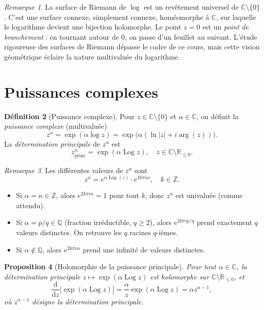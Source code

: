 \documentclass[12pt,a4paper,openany]{book}
\theoremstyle{definition}
\newtheorem{definition}{Définition}[chapter]
\theoremstyle{plain}
\newtheorem{proposition}[definition]{Proposition}
\theoremstyle{remark}
\newtheorem{remarque}[definition]{Remarque}
\newcommand{\C}{\mathbb{C}}
\newcommand{\R}{\mathbb{R}}
\newcommand{\Z}{\mathbb{Z}}
\newcommand{\Q}{\mathbb{Q}}
\DeclareMathOperator{\Log}{Log}
\newcommand{\dd}{\mathrm{d}}
\newcommand{\abs}[1]{\left|#1\right|}
\begin{document}
\begin{remarque}\label{rem:surface-riemann-intuition}
La surface de Riemann de $\log$ est un revêtement universel de $\C \setminus \{0\}$. C'est une surface connexe, simplement connexe, homéomorphe à $\C$, sur laquelle le logarithme devient une bijection holomorphe. Le point $z = 0$ est un \emph{point de branchement} : en tournant autour de $0$, on passe d'un feuillet au suivant. L'étude rigoureuse des surfaces de Riemann dépasse le cadre de ce cours, mais cette vision géométrique éclaire la nature multivaluée du logarithme.
\end{remarque}

\section{Puissances complexes}\label{sec:puissances}

\begin{definition}[Puissance complexe]\label{def:puissance-complexe}
Pour $z \in \C \setminus \{0\}$ et $\alpha \in \C$, on définit la \emph{puissance complexe} (multivaluée)
\[
  z^\alpha = \exp(\alpha \log z) = \exp\bigl(\alpha(\ln\abs{z} + i\arg(z))\bigr).
\]
La \emph{détermination principale} de $z^\alpha$ est
\[
  z^\alpha_{\mathrm{princ}} = \exp(\alpha \Log z), \quad z \in \C \setminus \R_{\leq 0}.
\]
\end{definition}

\begin{remarque}\label{rem:puissance-multivaluee}
Les différentes valeurs de $z^\alpha$ sont
\[
  z^\alpha = e^{\alpha \Log(z)} \cdot e^{2k\pi i \alpha}, \quad k \in \Z.
\]
\begin{itemize}
  \item Si $\alpha = n \in \Z$, alors $e^{2k\pi i n} = 1$ pour tout $k$, donc $z^n$ est univaluée (comme attendu).
  \item Si $\alpha = p/q \in \Q$ (fraction irréductible, $q \geq 2$), alors $e^{2k\pi i p/q}$ prend exactement $q$ valeurs distinctes. On retrouve les $q$ racines $q$-ièmes.
  \item Si $\alpha \notin \Q$, alors $e^{2k\pi i \alpha}$ prend une infinité de valeurs distinctes.
\end{itemize}
\end{remarque}

\begin{proposition}[Holomorphie de la puissance principale]\label{prop:puissance-holomorphe}
Pour tout $\alpha \in \C$, la détermination principale $z \mapsto \exp(\alpha \Log z)$ est holomorphe sur $\C \setminus \R_{\leq 0}$, et
\[
  \frac{\dd}{\dd z}\bigl[\exp(\alpha \Log z)\bigr] = \frac{\alpha}{z}\exp(\alpha \Log z) = \alpha z^{\alpha - 1},
\]
où $z^{\alpha-1}$ désigne la détermination principale.
\end{proposition}
\end{document}
